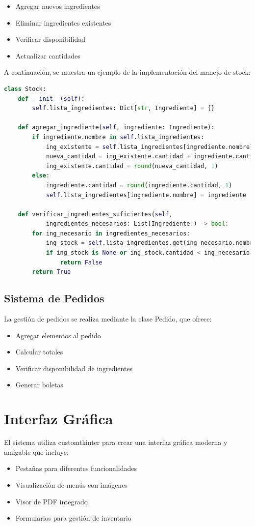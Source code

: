 \documentclass[12pt,letterpaper]{article}
\begin{document}
\begin{itemize}
    \item Agregar nuevos ingredientes
    \item Eliminar ingredientes existentes
    \item Verificar disponibilidad
    \item Actualizar cantidades
\end{itemize}

A continuación, se muestra un ejemplo de la implementación del manejo de stock:

\begin{lstlisting}[language=Python, caption=Implementación de Stock]
class Stock:
    def __init__(self):
        self.lista_ingredientes: Dict[str, Ingrediente] = {}

    def agregar_ingrediente(self, ingrediente: Ingrediente):
        if ingrediente.nombre in self.lista_ingredientes:
            ing_existente = self.lista_ingredientes[ingrediente.nombre]
            nueva_cantidad = ing_existente.cantidad + ingrediente.cantidad
            ing_existente.cantidad = round(nueva_cantidad, 1)
        else:
            ingrediente.cantidad = round(ingrediente.cantidad, 1)
            self.lista_ingredientes[ingrediente.nombre] = ingrediente

    def verificar_ingredientes_suficientes(self, 
            ingredientes_necesarios: List[Ingrediente]) -> bool:
        for ing_necesario in ingredientes_necesarios:
            ing_stock = self.lista_ingredientes.get(ing_necesario.nombre)
            if ing_stock is None or ing_stock.cantidad < ing_necesario.cantidad:
                return False
        return True
\end{lstlisting}

\subsection{Sistema de Pedidos}
La gestión de pedidos se realiza mediante la clase Pedido, que ofrece:
\begin{itemize}
    \item Agregar elementos al pedido
    \item Calcular totales
    \item Verificar disponibilidad de ingredientes
    \item Generar boletas
\end{itemize}

\section{Interfaz Gráfica}
El sistema utiliza customtkinter para crear una interfaz gráfica moderna y amigable que incluye:
\begin{itemize}
    \item Pestañas para diferentes funcionalidades
    \item Visualización de menús con imágenes
    \item Visor de PDF integrado
    \item Formularios para gestión de inventario
\end{itemize}
\end{document}
